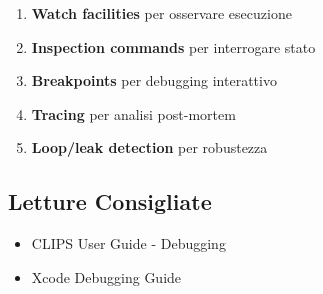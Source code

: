 \begin{enumerate}
\item \textbf{Watch facilities} per osservare esecuzione
\item \textbf{Inspection commands} per interrogare stato
\item \textbf{Breakpoints} per debugging interattivo
\item \textbf{Tracing} per analisi post-mortem
\item \textbf{Loop/leak detection} per robustezza
\end{enumerate}

\subsection{Letture Consigliate}

\begin{itemize}
\item CLIPS User Guide - Debugging
\item Xcode Debugging Guide
\end{itemize}
